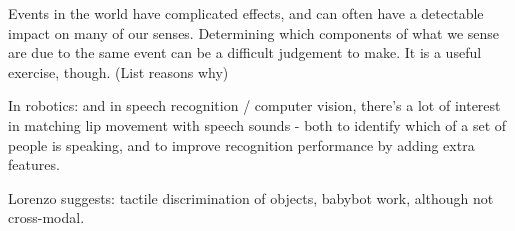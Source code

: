 
Events in the world have complicated effects, and can often have
a detectable impact on many of our senses.  Determining which
components of what we sense are due to the same event can be a 
difficult judgement to make.  It is a useful exercise, though.
(List reasons why)


\cite{lewkowicz00development}
\cite{lewkowicz80crossmodal}
\cite{lewkowicz04learning}
\cite{bahrick04development}
\cite{hernandez01development}
\cite{bahrick03development}
\cite{bahrick00intersensory}
\cite{gibson86ecological}
\cite{prince05synching}

In robotics: and in speech recognition / computer vision, there's
a lot of interest in matching lip movement with speech sounds - 
both to identify which of a set of people is speaking, and to
improve recognition performance by adding extra features.

Lorenzo suggests: tactile discrimination of objects, babybot work,
although not cross-modal.

